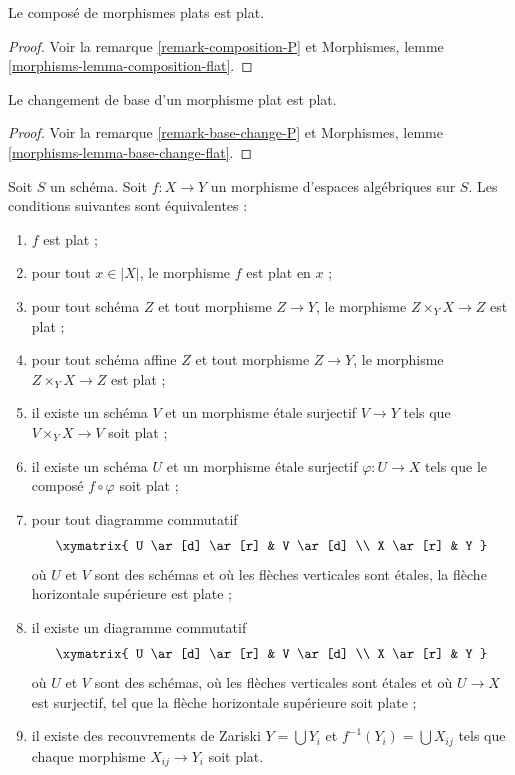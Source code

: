 \begin{lemma}
\label{lemma-composition-flat}
Le composé de morphismes plats est plat.
\end{lemma}

\begin{proof}
Voir la remarque \ref{remark-composition-P} et
Morphismes, lemme \ref{morphisms-lemma-composition-flat}.
\end{proof}

\begin{lemma}
\label{lemma-base-change-flat}
Le changement de base d'un morphisme plat est plat.
\end{lemma}

\begin{proof}
Voir la remarque \ref{remark-base-change-P} et
Morphismes, lemme \ref{morphisms-lemma-base-change-flat}.
\end{proof}

\begin{lemma}
\label{lemma-flat-local}
Soit $S$ un schéma.
Soit $f : X \to Y$ un morphisme d'espaces algébriques sur $S$.
Les conditions suivantes sont équivalentes :
\begin{enumerate}
\item $f$ est plat ;
\item pour tout $x \in |X|$, le morphisme $f$ est plat en $x$ ;
\item pour tout schéma $Z$ et tout morphisme $Z \to Y$, le morphisme
$Z \times_Y X \to Z$ est plat ;
\item pour tout schéma affine $Z$ et tout morphisme
$Z \to Y$, le morphisme $Z \times_Y X \to Z$ est plat ;
\item il existe un schéma $V$ et un morphisme étale surjectif
$V \to Y$ tels que $V \times_Y X \to V$ soit plat ;
\item il existe un schéma $U$ et un morphisme étale surjectif
$\varphi : U \to X$ tels que le composé $f \circ \varphi$
soit plat ;
\item pour tout diagramme commutatif
$$
\xymatrix{
U \ar[d] \ar[r] & V \ar[d] \\
X \ar[r] & Y
}
$$
où $U$ et $V$ sont des schémas et où les flèches verticales sont étales,
la flèche horizontale supérieure est plate ;
\item il existe un diagramme commutatif
$$
\xymatrix{
U \ar[d] \ar[r] & V \ar[d] \\
X \ar[r] & Y
}
$$
où $U$ et $V$ sont des schémas, où les flèches verticales sont étales et où
$U \to X$ est surjectif, tel que la flèche horizontale supérieure soit plate ;
\item il existe des recouvrements de Zariski $Y = \bigcup Y_i$ et
$f^{-1}(Y_i) = \bigcup X_{ij}$ tels que
chaque morphisme $X_{ij} \to Y_i$ soit plat.
\end{enumerate}
\end{lemma}

